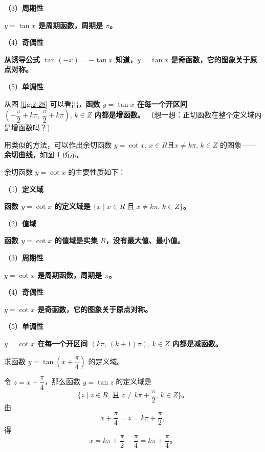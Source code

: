 （3）\textbf{周期性} 

\textbf{$y = \tan x$ 是周期函数，周期是 $\pi$。}

（4）\textbf{奇偶性} 

\textbf{从诱导公式 $\tan(-x) = -\tan x$ 知道，$y = \tan x$ 是奇函数，它的图象关于原点对称。}

（5）\textbf{单调性} 

从图 \ref{fig:2-28} 可以看出，\textbf{函数 $y = \tan x$ 在每一个开区间
$(-\dfrac \pi 2 + k\pi, \, \dfrac \pi 2 + k\pi), \, k \in Z$ 内都是增函数。}
（想一想：正切函数在整个定义域内是增函数吗？)

用类似的方法，可以作出余切函数
$y = \cot x, \, x \in R \text{且} x \neq k\pi, \, k \in Z$
的图象——\textbf{余切曲线}，如图 \ref{fig:2-29} 所示。

\begin{figure}[htbp]
    \centering
    
    \caption{}\label{fig:2-29}
\end{figure}

余切函数 $y = \cot x$ 的主要性质如下：

（1）\textbf{定义域} 

\textbf{函数 $y = \cot x$ 的定义域是 $\{ x \mid x \in R \; \text{且} \; x \neq k\pi, \, k \in Z \}$。}

（2）\textbf{值域} 

\textbf{函数 $y  = \cot x$ 的值域是实集 $R$，没有最大值、最小值。}

（3）\textbf{周期性} 

\textbf{$y = \cot x$ 是周期函数，周期是 $\pi$。}

（4）\textbf{奇偶性} 

\textbf{$y = \cot x$ 是奇函数，它的图象关于原点对称。}

（5）\textbf{单调性} 

\textbf{$y = \cot x$ 在每一个开区间 $(k\pi, \, (k + 1)\pi), \, k \in Z$ 内都是减函数。}

\vspace{0.5em}
\liti 求函数 $y = \tan \left( x + \dfrac \pi 4 \right)$ 的定义域。
\vspace{0.5em}

\jie 令 $z = x + \dfrac \pi 4$，那么函数 $y = \tan z$ 的定义域是
$$\{ z \mid z \in R, \, \text{且} \; z \neq k\pi + \dfrac \pi 2, \, k \in Z \} \text{。}$$
由
$$x + \dfrac \pi 4 = z = k\pi + \dfrac \pi 2,$$
得
$$x = k\pi + \dfrac \pi 2 - \dfrac \pi 4 = k\pi + \dfrac \pi 4 \text{。}$$

